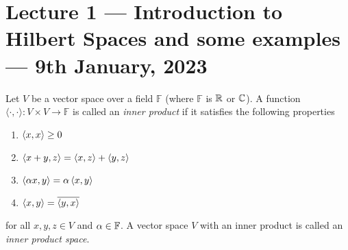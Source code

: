 \section{Lecture 1  --- Introduction to Hilbert Spaces and some examples --- 9th January, 2023}

\begin{definition}
    Let $V$ be a vector space over a field $\mathbb F$ (where $\mathbb F$ is $\mathbb R$ or $\mathbb C$). A function $\langle \cdot , \cdot \rangle : V \times V \to \mathbb F$ is called an \textit{inner product} if it satisfies the following properties
    \begin{enumerate}
	\item $\left\langle x, x \right\rangle \ge 0$
	\item $\left\langle x+y, z \right\rangle = \left\langle x, z \right\rangle + \left\langle y, z \right\rangle$
	\item $\left\langle \alpha x, y \right\rangle = \alpha \left\langle x, y \right\rangle$
	\item $\left\langle x, y \right\rangle = \overline{\left\langle y, x \right\rangle}$
    \end{enumerate}
    for all $x,y,z \in V$ and $\alpha \in \mathbb F$. A vector space $V$ with an inner product is called an \textit{inner product space}.
    \label{def:inner-product}
\end{definition}

